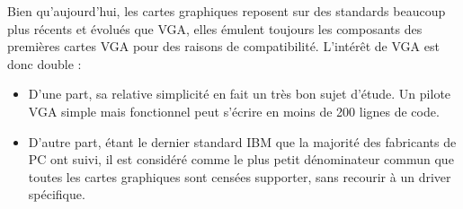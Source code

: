 Bien qu'aujourd'hui, les cartes graphiques reposent sur des standards beaucoup plus récents et évolués que VGA, elles émulent toujours les composants des premières cartes VGA pour des raisons de compatibilité. L'intérêt de VGA est donc double : 
\begin{itemize} \vspace{1ex} \itemsep1ex
 \item D'une part, sa relative simplicité en fait un très bon sujet d'étude. Un pilote VGA simple mais fonctionnel peut s'écrire en moins de 200 lignes de code.
 \item D'autre part, étant le dernier standard IBM que la majorité des fabricants de PC ont suivi, il est considéré comme le plus petit dénominateur commun que toutes les cartes graphiques sont censées supporter, sans recourir à un driver spécifique.
\end{itemize}

\vspace{1em}

